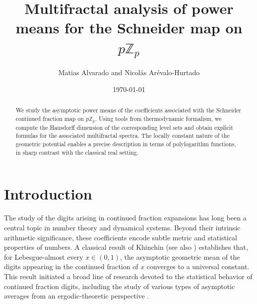\documentclass[11pt]{amsart}
\theoremstyle{remark}
\numberwithin{equation}{section}
\newcommand{\Z}{\mathbb{Z}}
\begin{document}
\title{Multifractal analysis of power means for the Schneider map on $p\mathbb{Z}_{p}$}


\date{\today}




\author{ Matias Alvarado and Nicol\'as Ar\'evalo-Hurtado}	
\address{Instituto de Matem\'aticas, Universidad de Talca, Talca, Chile.}
\address{Universidad Escuela Colombiana de Ingenier\'ia Julio Garavito, Bogot\'a, Colombia.}



\begin{abstract}
We study the asymptotic power means of the coefficients associated with the Schneider continued fraction map on $p\Z_p$. Using tools from thermodynamic formalism, we compute the Hausdorff dimension of the corresponding level sets and obtain explicit formulas for the associated multifractal spectra. The locally constant nature of the geometric potential enables a precise description in terms of polylogarithm functions, in sharp contrast with the classical real setting.

\end{abstract}

\maketitle
\vspace{-10mm}
\section{Introduction}\label{introduction}
The study of the digits arising in continued fraction expansions has long been a central topic in number theory and dynamical systems. Beyond their intrinsic arithmetic significance, these coefficients encode subtle metric and statistical properties of numbers. A classical result of Khinchin \cite{Khinchin35} (see also \cite{Khinchin}) establishes that, for Lebesgue-almost every $x\in (0,1)$, the asymptotic geometric mean of the digits appearing in the continued fraction of $x$ converges to a universal constant. This result initiated a broad line of research devoted to the statistical behavior of continued fraction digits, including the study of various types of asymptotic averages from an ergodic-theoretic perspective \cite{HMR, RyllNardzewski}.
\end{document}

